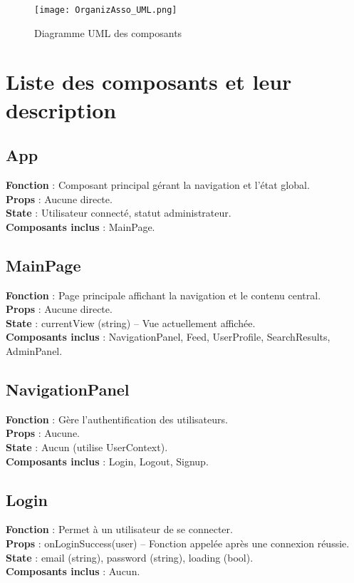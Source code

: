 \documentclass{article}
\begin{document}
\vspace{1cm} %

\begin{figure}[h]
    \centering
    \texttt{[image: OrganizAsso\_UML.png]}
    \caption{Diagramme UML des composants}
    \label{fig:uml_diagram}
\end{figure}

\section*{Liste des composants et leur description}

\subsection*{App}
\textbf{Fonction} : Composant principal gérant la navigation et l'état global.\\
\textbf{Props} : Aucune directe.\\
\textbf{State} : Utilisateur connecté, statut administrateur.\\
\textbf{Composants inclus} : MainPage.

\subsection*{MainPage}
\textbf{Fonction} : Page principale affichant la navigation et le contenu central.\\
\textbf{Props} : Aucune directe.\\
\textbf{State} : currentView (string) – Vue actuellement affichée.\\
\textbf{Composants inclus} : NavigationPanel, Feed, UserProfile, SearchResults, AdminPanel.

\subsection*{NavigationPanel}
\textbf{Fonction} : Gère l'authentification des utilisateurs.\\
\textbf{Props} : Aucune.\\
\textbf{State} : Aucun (utilise UserContext).\\
\textbf{Composants inclus} : Login, Logout, Signup.

\subsection*{Login}
\textbf{Fonction} : Permet à un utilisateur de se connecter.\\
\textbf{Props} : onLoginSuccess(user) – Fonction appelée après une connexion réussie.\\
\textbf{State} : email (string), password (string), loading (bool).\\
\textbf{Composants inclus} : Aucun.
\end{document}
